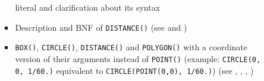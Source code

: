 \documentclass[11pt,a4paper]{ivoa}
\begin{document}
\begin{itemize}
\begin{itemize}
\begin{itemize}
                          literal and clarification about its syntax
                    \item Description and BNF of \verb:DISTANCE():
                          (see  and
                          )
                    \item \verb:BOX():, \verb:CIRCLE():, \verb:DISTANCE(): and
                          \verb:POLYGON(): with a coordinate version of their
                          arguments instead of \verb:POINT(): (example:
                          \verb:CIRCLE(0, 0, 1/60.): equivalent to
                          \verb:CIRCLE(POINT(0,0), 1/60.):)
                          (see ,
                          ,
                          ,
                          )
                \end{itemize}
        \end{itemize}
\end{itemize}

\clearpage %

\end{document}
